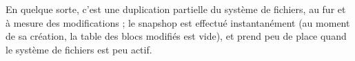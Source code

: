 \begin{multicols}{2}
En quelque sorte, c'est une duplication partielle du système de
fichiers, au fur et à mesure des modifications ; le snapshop est
effectué instantanément (au moment de sa création, la table des
blocs modifiés est vide), et prend peu de place quand le système de
fichiers est peu actif.

\end{multicols}


